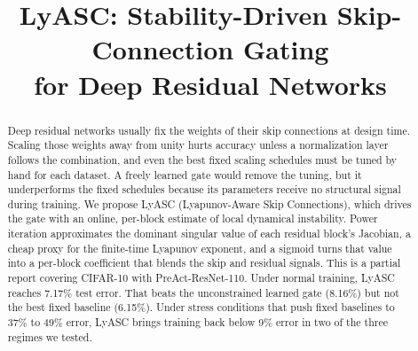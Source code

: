 \documentclass[conference,10pt]{IEEEtran}
\begin{document}
\title{LyASC: Stability-Driven Skip-Connection Gating\\for Deep Residual Networks}

\author{
\and
{}
\and
{}
}

\maketitle

\begin{abstract}
Deep residual networks usually fix the weights of their skip
connections at design time. Scaling those weights away from unity hurts
accuracy unless a normalization layer follows the combination, and even
the best fixed scaling schedules must be tuned by hand for each
dataset. A freely learned gate would remove the tuning, but it
underperforms the fixed schedules because its parameters receive no
structural signal during training. We propose LyASC (Lyapunov-Aware
Skip Connections), which drives the gate with an online, per-block
estimate of local dynamical instability. Power iteration approximates
the dominant singular value of each residual block's Jacobian, a cheap
proxy for the finite-time Lyapunov exponent, and a sigmoid turns that
value into a per-block coefficient that blends the skip and residual
signals. This is a partial report covering CIFAR-10 with
PreAct-ResNet-110. Under normal training, LyASC reaches 7.17\% test
error. That beats the unconstrained learned gate (8.16\%) but not the
best fixed baseline (6.15\%). Under stress conditions that push fixed
baselines to 37\% to 49\% error, LyASC brings training back below 9\%
error in two of the three regimes we tested.
\end{abstract}
\end{document}
